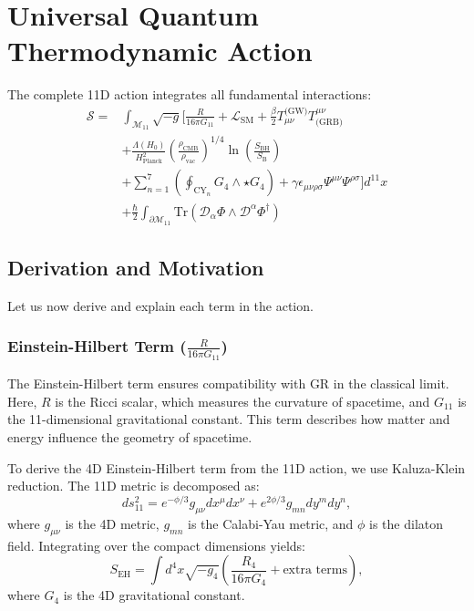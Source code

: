 \documentclass[12pt, a4paper]{article}
\begin{document}
\section{Universal Quantum Thermodynamic Action}
The complete 11D action integrates all fundamental interactions:
\[
\boxed{
\begin{aligned}
\mathcal{S} = & \int_{\mathcal{M}_{11}} \sqrt{-g} \Bigg[ \frac{R}{16\pi G_{11}} + \mathcal{L}_{\text{SM}} + \frac{\beta}{2} T_{\mu\nu}^{\text{(GW)}} T^{\mu\nu}_{\text{(GRB)}} \\
& + \frac{\Lambda(H_0)}{H_{\text{Planck}}^2} \left( \frac{\rho_{\text{CMB}}}{\rho_{\text{vac}}} \right)^{1/4} \ln\left(\frac{S_{\text{BH}}}{S_{\text{B}}}\right) \\
& + \sum_{n=1}^7 \left( \oint_{\text{CY}_n} G_4 \wedge \star G_4 \right) + \gamma \epsilon_{\mu\nu\rho\sigma} \Psi^{\mu\nu} \Psi^{\rho\sigma} \Bigg] d^{11}x \\
& + \frac{\hbar}{2} \int_{\partial\mathcal{M}_{11}} \text{Tr}\left( \mathcal{D}_\alpha \Phi \wedge \mathcal{D}^\alpha \Phi^\dagger \right)
\end{aligned}
}
\]

\subsection{Derivation and Motivation}
Let us now derive and explain each term in the action.

\subsubsection{Einstein-Hilbert Term ($\frac{R}{16\pi G_{11}}$)}
The Einstein-Hilbert term ensures compatibility with GR in the classical limit. Here, $R$ is the Ricci scalar, which measures the curvature of spacetime, and $G_{11}$ is the 11-dimensional gravitational constant. This term describes how matter and energy influence the geometry of spacetime.

To derive the 4D Einstein-Hilbert term from the 11D action, we use Kaluza-Klein reduction. The 11D metric is decomposed as:
\[
ds^2_{11} = e^{-\phi/3} g_{\mu\nu}dx^\mu dx^\nu + e^{2\phi/3} g_{mn}dy^m dy^n,
\]
where \(g_{\mu\nu}\) is the 4D metric, \(g_{mn}\) is the Calabi-Yau metric, and \(\phi\) is the dilaton field. Integrating over the compact dimensions yields:
\[
S_{\text{EH}} = \int d^4x \sqrt{-g_4} \left( \frac{R_4}{16\pi G_4} + \text{extra terms} \right),
\]
where \(G_4\) is the 4D gravitational constant.
\end{document}
